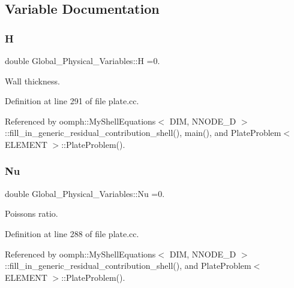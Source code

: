 \subsection{Variable Documentation}
\mbox{\label{namespaceGlobal__Physical__Variables_af6e07423e22c0991084d9a2f43727805}} 
\subsubsection{\texorpdfstring{H}{H}}
{\footnotesize\ttfamily double Global\+\_\+\+Physical\+\_\+\+Variables\+::H =0.}



Wall thickness. 



Definition at line 291 of file plate.\+cc.



Referenced by oomph\+::\+My\+Shell\+Equations$<$ D\+I\+M, N\+N\+O\+D\+E\+\_\+D $>$\+::fill\+\_\+in\+\_\+generic\+\_\+residual\+\_\+contribution\+\_\+shell(), main(), and Plate\+Problem$<$ E\+L\+E\+M\+E\+N\+T $>$\+::\+Plate\+Problem().

\mbox{\label{namespaceGlobal__Physical__Variables_a3962c36313826b19f216f6bbbdd6a477}} 
\subsubsection{\texorpdfstring{Nu}{Nu}}
{\footnotesize\ttfamily double Global\+\_\+\+Physical\+\_\+\+Variables\+::\+Nu =0.}



Poisson\textquotesingle{}s ratio. 



Definition at line 288 of file plate.\+cc.



Referenced by oomph\+::\+My\+Shell\+Equations$<$ D\+I\+M, N\+N\+O\+D\+E\+\_\+D $>$\+::fill\+\_\+in\+\_\+generic\+\_\+residual\+\_\+contribution\+\_\+shell(), and Plate\+Problem$<$ E\+L\+E\+M\+E\+N\+T $>$\+::\+Plate\+Problem().

